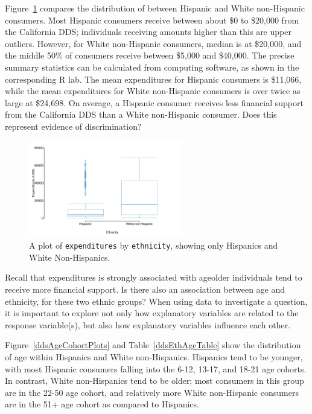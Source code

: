 Figure~\ref{ddsExpHispWhite} compares the distribution of  between Hispanic and White non-Hispanic consumers. Most Hispanic consumers receive between about \$0 to \$20,000 from the California DDS; individuals receiving amounts higher than this are upper outliers. However, for White non-Hispanic consumers, median  is at \$20,000, and the middle 50\% of consumers receive between \$5,000 and \$40,000. The precise summary statistics can be calculated from computing software, as shown in the corresponding \textsf{R} lab. The mean expenditures for Hispanic consumers is \$11,066, while the mean expenditures for White non-Hispanic consumers is over twice as large at \$24,698. On average, a Hispanic consumer receives less financial support from the California DDS than a White non-Hispanic consumer. Does this represent evidence of discrimination?

\begin{figure}[h]
	\centering
	\includegraphics[width=0.6\textwidth]{ch_intro_to_data_oi_biostat/figures/ddsExpHispWhite/ddsExpHispWhite}
	\caption{A plot of \texttt{expenditures} by \texttt{ethnicity}, showing only Hispanics and White Non-Hispanics.}
	\label{ddsExpHispWhite}
\end{figure}

Recall that expenditures is strongly associated with age\textemdash older individuals tend to receive more financial support. Is there also an association between age and ethnicity, for these two ethnic groups? When using data to investigate a question, it is important to explore not only how explanatory variables are related to the response variable(s), but also how explanatory variables influence each other. 

Figure~\ref{ddsAgeCohortPlots} and Table~\ref{ddsEthAgeTable} show the distribution of age within Hispanics and White non-Hispanics. Hispanics tend to be younger, with most Hispanic consumers falling into the 6-12, 13-17, and 18-21 age cohorts. In contrast, White non-Hispanics tend to be older; most consumers in this group are in the 22-50 age cohort, and relatively more White non-Hispanic consumers are in the 51+ age cohort as compared to Hispanics.

